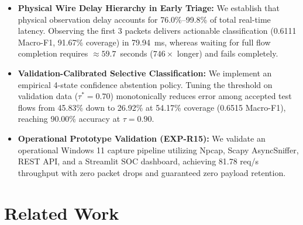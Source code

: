 \documentclass[conference]{IEEEtran}
\begin{document}
\begin{itemize}
    \item \textbf{Physical Wire Delay Hierarchy in Early Triage:} We establish that physical observation delay accounts for 76.0\%--99.8\% of total real-time latency. Observing the first 3 packets delivers actionable classification (0.6111 Macro-F1, 91.67\% coverage) in 79.94~ms, whereas waiting for full flow completion requires $\approx 59.7$~seconds ($746\times$ longer) and fails completely.
    \item \textbf{Validation-Calibrated Selective Classification:} We implement an empirical 4-state confidence abstention policy. Tuning the threshold on validation data ($\tau^* = 0.70$) monotonically reduces error among accepted test flows from 45.83\% down to 26.92\% at 54.17\% coverage (0.6515 Macro-F1), reaching 90.00\% accuracy at $\tau = 0.90$.
    \item \textbf{Operational Prototype Validation (EXP-R15):} We validate an operational Windows 11 capture pipeline utilizing Npcap, Scapy AsyncSniffer, REST API, and a Streamlit SOC dashboard, achieving 81.78 req/s throughput with zero packet drops and guaranteed zero payload retention.
\end{itemize}

\section{Related Work}
\label{sec:related}
\end{document}
